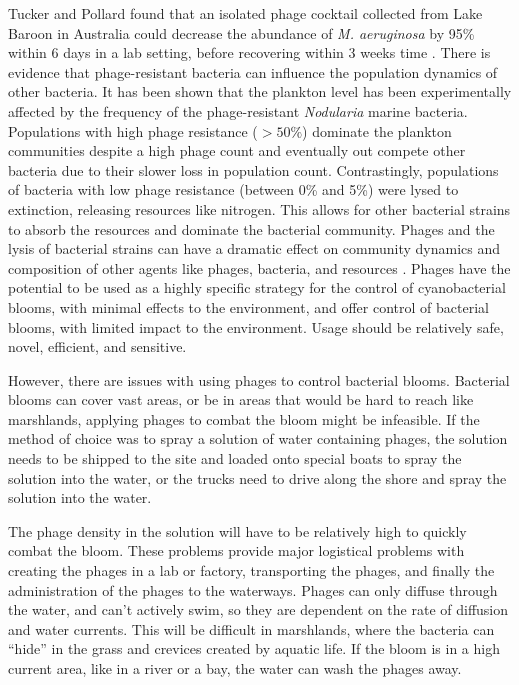 Tucker and Pollard found that an isolated phage cocktail collected from Lake Baroon in Australia could decrease the abundance of \textit{M. aeruginosa} by 95\% within 6 days in a lab setting, before recovering within 3 weeks time \cite{tuckerIdentificationCyanophageMaLBP2005}. \newline
There is evidence that phage-resistant bacteria can influence the population dynamics of other bacteria.
It has been shown that the plankton level has been experimentally affected by the frequency of the phage-resistant \textit{Nodularia} marine bacteria.
Populations with high phage resistance ($>50\%$) dominate the plankton communities despite a high phage count and eventually out compete other bacteria due to their slower loss in population count.
Contrastingly, populations of bacteria with low phage resistance (between 0\% and 5\%) were lysed to extinction, releasing resources like nitrogen.
This allows for other bacterial strains to absorb the resources and dominate the bacterial community.
Phages and the lysis of bacterial strains can have a dramatic effect on community dynamics and composition of other agents like phages, bacteria, and resources \cite{colomaFrequencyVirusresistantHosts2019}.
Phages have the potential to be used as a highly specific strategy for the control of cyanobacterial blooms, with minimal effects to the environment, and offer control of bacterial blooms, with limited impact to the environment.
Usage should be relatively safe, novel, efficient, and sensitive.  

However, there are issues with using phages to control bacterial blooms.
Bacterial blooms can cover vast areas, or be in areas that would be hard to reach like marshlands, applying phages to combat the bloom might be infeasible.
If the method of choice was to spray a solution of water containing phages, the solution needs to be shipped to the site and loaded onto special boats to spray the solution into the water, or the trucks need to drive along the shore and spray the solution into the water.

The phage density in the solution will have to be relatively high to quickly combat the bloom.
These problems provide major logistical problems with creating the phages in a lab or factory, transporting the phages, and finally the administration of the phages to the waterways.
Phages can only diffuse through the water, and can't actively swim, so they are dependent on the rate of diffusion and water currents.
This will be difficult in marshlands, where the bacteria can “hide” in the grass and crevices created by aquatic life.
If the bloom is in a high current area, like in a river or a bay, the water can wash the phages away.

